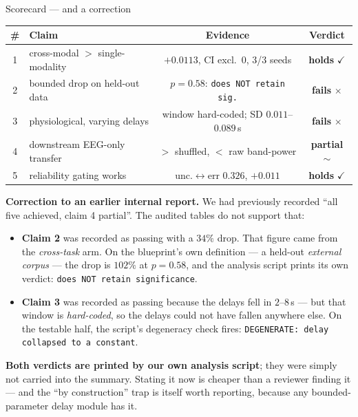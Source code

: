 \documentclass[aspectratio=169,11pt]{beamer}
\newcommand{\yes}{\textcolor{good}{\ensuremath{\checkmark}}}
\newcommand{\no}{\textcolor{bad}{\ensuremath{\times}}}
\newcommand{\pmark}{\textcolor{warn}{\ensuremath{\sim}}}
\begin{document}
\begin{frame}{Scorecard --- and a correction}
\begin{center}\small
\begin{tabular}{clcc}
\toprule
\# & Claim & Evidence & Verdict \\
\midrule
1 & cross-modal $>$ single-modality & $+0.0113$, CI excl.\ 0, 3/3 seeds & \textbf{holds} \yes \\
2 & bounded drop on held-out data & $p=0.58$: \texttt{does NOT retain sig.} & \textbf{fails} \no \\
3 & physiological, varying delays & window hard-coded; SD $0.011$--$0.089$\,s & \textbf{fails} \no \\
4 & downstream EEG-only transfer & $>$ shuffled, $<$ raw band-power & \textbf{partial} \pmark \\
5 & reliability gating works & unc.$\leftrightarrow$err $0.326$, $+0.011$ & \textbf{holds} \yes \\
\bottomrule
\end{tabular}
\end{center}

\vspace{0.8em}
\textcolor{warn}{\textbf{Correction to an earlier internal report.}} We had
previously recorded ``all five achieved, claim 4 partial''. The audited tables do
not support that:
\begin{itemize}
  \item \textbf{Claim 2} was recorded as passing with a $34\%$ drop. That figure
        came from the \emph{cross-task} arm. On the blueprint's own definition ---
        a held-out \emph{external corpus} --- the drop is $102\%$ at $p=0.58$, and
        the analysis script prints its own verdict: \texttt{does NOT retain
        significance}.
  \item \textbf{Claim 3} was recorded as passing because the delays fell in
        $2$--$8$\,s --- but that window is \emph{hard-coded}, so the delays could
        not have fallen anywhere else. On the testable half, the script's
        degeneracy check fires: \texttt{DEGENERATE: delay collapsed to a constant}.
\end{itemize}

\vspace{0.3em}
\textbf{Both verdicts are printed by our own analysis script}; they were simply
not carried into the summary. Stating it now is cheaper than a reviewer finding
it --- and the ``by construction'' trap is itself worth reporting, because any
bounded-parameter delay module has it.
\end{frame}
\end{document}

